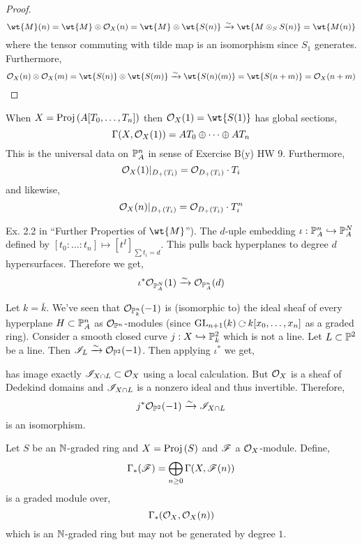 \documentclass[12pt]{article}
\begin{document}
\begin{proof}
\[ \wt{M}(n) = \wt{M} \ot \struct{X}(n) = \wt{M} \ot \wt{S(n)} \iso \wt{M \ot_S S(n)} = \wt{M(n)} \]
where the tensor commuting with tilde map is an isomorphism since $S_1$ generates. Furthermore, 
\[ \struct{X}(n) \ot \struct{X}(m) = \wt{S(n)} \ot \wt{S(m)} \iso \wt{S(n)(m)} = \wt{S(n+m)} = \struct{X}(n+m) \]
\end{proof}

\begin{example}
When $X = \Proj{A[T_0, \dots, T_n]}$ then $\struct{X}(1) = \wt{S(1)}$ has global sections,
\[ \Gamma(X, \struct{X}(1)) = A T_0 \oplus \cdots \oplus A T_n \]
This is the universal data on $\P^n_A$ in sense of Exercise B(y) HW 9.  Furthermore,
\[ \struct{X}(1)|_{D_+(T_i)} = \struct{D_+(T_i)} \cdot T_i \]
and likewise,
\[ \struct{X}(n)|_{D_+(T_i)} = \struct{D_+(T_i)} \cdot T_i^n \]
\end{example}

\begin{example}
Ex. 2.2 in ``Further Properties of $\wt{M}$''). The $d$-uple embedding $\iota : \P^n_A \embed \P^N_A$ defined by $[t_0 : \dots : t_n] \mapsto [t^I]_{\sum t_i = d}$. This pulls back hyperplanes to degree $d$ hypersurfaces. Therefore we get,
\[ \iota^* \struct{\P^N_A}(1) \iso \struct{\P^n_A}(d) \]
\end{example}

\begin{example}
Let $k = \bar{k}$. We've seen that $\struct{\P^n_k}(-1)$ is (isomorphic to) the ideal sheaf of every hyperplane $H \subset \P^n_A$ as $\struct{\P^n}$-modules (since $\mathrm{GL}_{n+1}(k) \acts k[x_0, \dots, x_n]$ as a graded ring). Consider a smooth closed curve $j : X \embed \P^2_k$ which is not a line. Let $L \subset \P^2$ be a line. Then $\I_L \iso \struct{\P^2}(-1)$. Then applying $\iota^*$ we get,
\begin{center}
\end{center}
has image exactly $\I_{X \cap L} \subset \struct{X}$ using a local calculation. But $\struct{X}$ is a sheaf of Dedekind domains and $\I_{X \cap L}$ is a nonzero ideal and thus invertible. Therefore,
\[ j^* \struct{\P^2}(-1) \iso \I_{X \cap L} \]
is an isomorphism. 
\end{example}

\begin{defn}
Let $S$ be an $\N$-graded ring and $X = \Proj{S}$ and $\F$ a $\struct{X}$-module. Define,
\[ \Gamma_*(\F) = \bigoplus_{n \ge 0} \Gamma(X, \F(n)) \]
is a graded module over,
\[ \Gamma_*(\struct{X}, \struct{X}(n)) \]
which is an $\N$-graded ring but may not be generated by degree $1$.
\end{defn}
\end{document}
